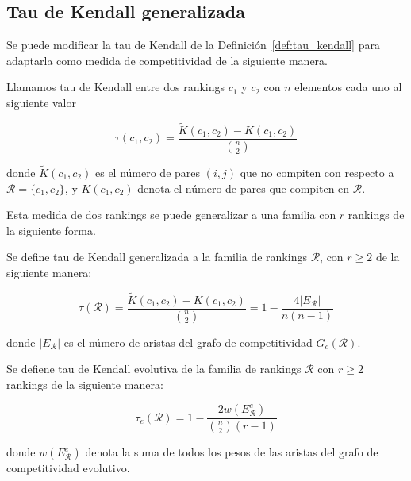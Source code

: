 \subsection*{Tau de Kendall generalizada}

Se puede modificar la tau de Kendall de la Definición~\ref{def:tau_kendall} para adaptarla como medida de competitividad de la siguiente manera.

\begin{defi}
Llamamos tau de Kendall entre dos rankings $c_1$ y $c_2$ con $n$ elementos cada uno al siguiente valor

\begin{equation}
\tau(c_1, c_2) = \dfrac{\tilde{K}(c_1, c_2) - K(c_1, c_2)}{\binom{n}{2}}
\end{equation} 

donde $\tilde{K}(c_1, c_2)$ es el número de pares $(i,j)$ que no compiten con respecto a $\mathcal{R} = \{c_1, c_2\}$, y $K(c_1, c_2)$ denota el número de pares que compiten en $\mathcal{R}$.
\end{defi}

Esta medida de dos rankings se puede generalizar a una familia con $r$ rankings de la siguiente forma.

\begin{defi}
Se define tau de Kendall generalizada a la familia de rankings $\mathcal{R}$, con $r \geq 2$ de la siguiente manera:

\begin{equation}
\tau(\mathcal{R}) = \dfrac{\tilde{K}(c_1, c_2) - K(c_1, c_2)}{\binom{n}{2}} = 1 - \dfrac{4 |E_\mathcal{R}|}{n(n-1)}
\end{equation}

donde $|E_\mathcal{R}|$ es el número de aristas del grafo de competitividad $G_c(\mathcal{R})$.
\end{defi}

\begin{defi}
Se defiene tau de Kendall evolutiva de la familia de rankings $\mathcal{R}$ con $r \geq 2$ rankings de la siguiente manera:

\begin{equation}
\tau_e(\mathcal{R}) = 1 - \dfrac{2 w(E_\mathcal{R}^e)}{\binom{n}{2}(r-1)}
\end{equation} 

donde $w(E_\mathcal{R}^e)$ denota la suma de todos los pesos de las aristas del grafo de competitividad evolutivo.
\end{defi}

